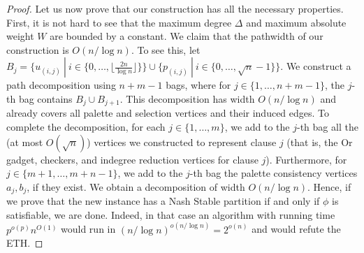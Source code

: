 \documentclass[letterpaper,USenglish,cleveref, autoref, thm-restate]{lipics-v2021}
\begin{document}
\begin{proof}
Let us now prove that our construction has all the necessary properties. First,
it is not hard to see that the maximum degree $\Delta$ and maximum absolute
weight $W$ are bounded by a constant. We claim that the pathwidth of our
construction is $O(n/\log n)$. To see this, let $B_j=\{ u_{(i,j)}\ |\
i\in\{0,\ldots,\lfloor\frac{2n}{\log n}\rfloor \}\} \cup \{ p_{(i,j)}\ |\
i\in\{0,\ldots,\sqrt{n}-1\} \}$. We construct a path decomposition using
$n+m-1$ bags, where for $j\in\{1,\ldots,n+m-1\}$, the $j$-th bag contains
$B_j\cup B_{j+1}$. This decomposition has width $O(n/\log n)$ and already
covers all palette and selection vertices and their induced edges. To complete
the decomposition, for each $j\in\{1,\ldots,m\}$, we add to the $j$-th bag all
the (at most $O(\sqrt{n})$) vertices we constructed to represent clause $j$
(that is, the Or gadget, checkers, and indegree reduction vertices for clause
$j$). Furthermore, for $j\in\{m+1,\ldots,m+n-1\}$, we add to the $j$-th bag the
palette consistency vertices $a_j,b_j$, if they exist. We obtain a
decomposition of width $O(n/\log n)$. Hence, if we prove that the new instance
has a Nash Stable partition if and only if $\phi$ is satisfiable, we are done.
Indeed, in that case an algorithm with running time $p^{o(p)}n^{O(1)}$ would
run in $(n/\log n)^{o(n/\log n)} = 2^{o(n)}$ and would refute the ETH.


\end{proof}
\end{document}
